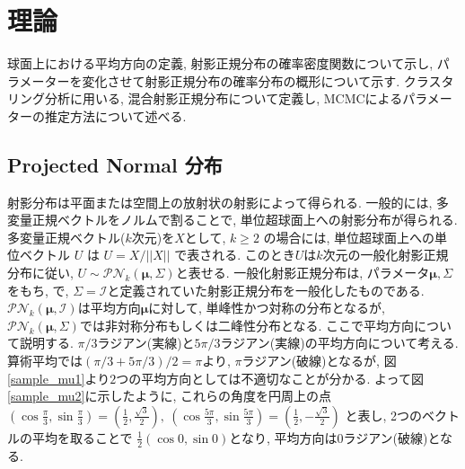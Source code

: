 \documentclass[a4j,12pt]{jarticle}
\begin{document}

\section{理論}

球面上における平均方向の定義, 射影正規分布の確率密度関数について示し, パラメーターを変化させて射影正規分布の確率分布の概形について示す. クラスタリング分析に用いる, 混合射影正規分布について定義し, MCMCによるパラメーターの推定方法について述べる.  

\subsection{Projected Normal 分布}

射影分布は平面または空間上の放射状の射影によって得られる. 一般的には, 多変量正規ベクトルをノルムで割ることで, 単位超球面上への射影分布が得られる. 多変量正規ベクトル($k$次元)を$X$として, $k \geq 2$ の場合には, 単位超球面上への単位ベクトル $U$ は $U = X/||X||$ で表される. このとき$U$は$k$次元の一般化射影正規分布に従い, $U \sim \mathcal{PN}_k(\bm \mu,\Sigma)$と表せる. 一般化射影正規分布は, パラメータ$\bm \mu, \Sigma$をもち, \citet{PML}で, $\Sigma = \mathcal{I}$と定義されていた射影正規分布を一般化したものである. $\mathcal{PN}_k(\bm \mu,\mathcal{I})$は平均方向$\bm \mu$に対して, 単峰性かつ対称の分布となるが, $\mathcal{PN}_k(\bm \mu,\Sigma)$では非対称分布もしくは二峰性分布となる. ここで平均方向について説明する. $\pi/3$ラジアン(実線)と$5\pi/3$ラジアン(実線)の平均方向について考える. 算術平均では$(\pi/3 + 5\pi/3)/2 = \pi$より, $\pi$ラジアン(破線)となるが, 図\ref{sample_mu1}より$2$つの平均方向としては不適切なことが分かる. よって図\ref{sample_mu2}に示したように, これらの角度を円周上の点 $(\cos \frac{\pi}{3},\sin \frac{\pi}{3}) = (\frac{1}{2},\frac{\sqrt{3}}{2}),\ (\cos \frac{5\pi}{3}, \sin \frac{5\pi}{3}) = (\frac{1}{2},- \frac{\sqrt{3}}{2})$ と表し, 2つのベクトルの平均を取ることで $\frac{1}{2} (\cos 0, \sin 0)$となり, 平均方向は$0$ラジアン(破線)となる. 
\end{document}
